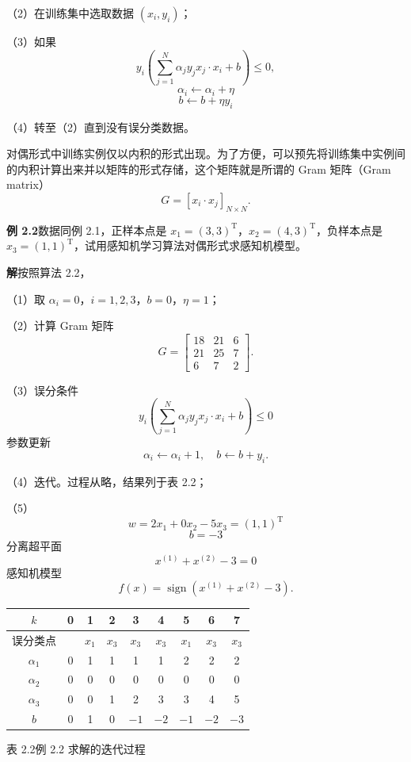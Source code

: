 \documentclass[UTF8,12pt,a4paper,fontset=fandol]{ctexart}
\begin{document}
（2）在训练集中选取数据 $(x_i,y_i)$；

（3）如果
\[
  y_i\left(\sum_{j=1}^N\alpha_jy_jx_j\cdot x_i+b\right)\le 0,
\]
\[
  \alpha_i\leftarrow\alpha_i+\eta
\]
\[
  b\leftarrow b+\eta y_i
\]

（4）转至（2）直到没有误分类数据。

对偶形式中训练实例仅以内积的形式出现。为了方便，可以预先将训练集中实例间的内积计算出来并以矩阵的形式存储，这个矩阵就是所谓的 Gram 矩阵（Gram matrix）
\[
  G=[x_i\cdot x_j]_{N\times N}.
\]

\noindent\textbf{例 2.2}\quad 数据同例 2.1，正样本点是 $x_1=(3,3)^\mathrm{T}$，$x_2=(4,3)^\mathrm{T}$，负样本点是 $x_3=(1,1)^\mathrm{T}$，试用感知机学习算法对偶形式求感知机模型。

\noindent\textbf{解}\quad 按照算法 2.2，

（1）取 $\alpha_i=0$，$i=1,2,3$，$b=0$，$\eta=1$；

（2）计算 Gram 矩阵
\[
  G=
  \begin{bmatrix}
    18 & 21 & 6\\
    21 & 25 & 7\\
    6 & 7 & 2
  \end{bmatrix}.
\]

（3）误分条件
\[
  y_i\left(\sum_{j=1}^N\alpha_jy_jx_j\cdot x_i+b\right)\le 0
\]
参数更新
\[
  \alpha_i\leftarrow\alpha_i+1,\quad b\leftarrow b+y_i.
\]

（4）迭代。过程从略，结果列于表 2.2；

（5）
\[
  w=2x_1+0x_2-5x_3=(1,1)^\mathrm{T}
\]
\[
  b=-3
\]
分离超平面
\[
  x^{(1)}+x^{(2)}-3=0
\]
感知机模型
\[
  f(x)=\operatorname{sign}(x^{(1)}+x^{(2)}-3).
\]

\begin{center}
\begin{tabular}{c c c c c c c c c}
\hline
$k$ & 0 & 1 & 2 & 3 & 4 & 5 & 6 & 7\\
\hline
误分类点 &  & $x_1$ & $x_3$ & $x_3$ & $x_3$ & $x_1$ & $x_3$ & $x_3$\\
$\alpha_1$ & 0 & 1 & 1 & 1 & 1 & 2 & 2 & 2\\
$\alpha_2$ & 0 & 0 & 0 & 0 & 0 & 0 & 0 & 0\\
$\alpha_3$ & 0 & 0 & 1 & 2 & 3 & 3 & 4 & 5\\
$b$ & 0 & 1 & 0 & $-1$ & $-2$ & $-1$ & $-2$ & $-3$\\
\hline
\end{tabular}

表 2.2\quad 例 2.2 求解的迭代过程
\end{center}
\end{document}
